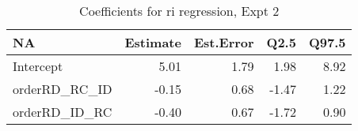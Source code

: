 \begin{table}[ht]
\centering
\begin{tabular}{lrrrr}
  \hline
NA & Estimate & Est.Error & Q2.5 & Q97.5 \\ 
  \hline
Intercept & 5.01 & 1.79 & 1.98 & 8.92 \\ 
  orderRD\_RC\_ID & -0.15 & 0.68 & -1.47 & 1.22 \\ 
  orderRD\_ID\_RC & -0.40 & 0.67 & -1.72 & 0.90 \\ 
   \hline
\end{tabular}
\caption{Coefficients for ri regression, Expt 2} 
\end{table}
